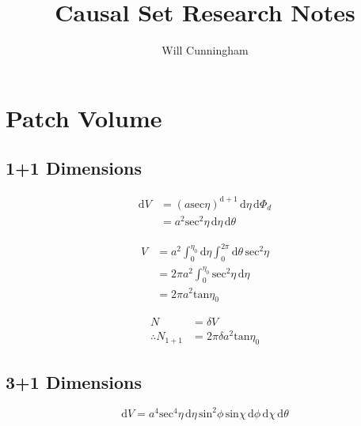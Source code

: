 \documentclass[12pt]{article}
\begin{document}
\title{Causal Set Research Notes}
\author{Will Cunningham}
\maketitle

\section{Patch Volume}
\subsection{1+1 Dimensions}

\begin{equation}
\begin{split}
\mathrm{d}V &= (a\mathrm{sec}\eta)^{\mathrm{d}+1} \, \mathrm{d}\eta \, \mathrm{d}\Phi_d \\
   &= a^2\mathrm{sec}^2\eta \, \mathrm{d}\eta \, \mathrm{d}\theta
\end{split}
\end{equation}

\begin{equation}
\begin{split}
V &= a^2\int_0^{\eta_0} \! \mathrm{d}\eta \int_0^{2\pi} \! \mathrm{d}\theta \, \mathrm{sec}^2\eta \\
  &= 2\pi a^2 \int_0^{\eta_0} \! \mathrm{sec}^2\eta \, \mathrm{d}\eta \\
  &= 2\pi a^2\mathrm{tan}\eta_0
\end{split}
\end{equation}

\begin{equation}
\begin{split}
N &= \delta V \\
\therefore N_{\mathrm{1+1}} &= 2\pi\delta a^2 \mathrm{tan}\eta_0
\end{split}
\end{equation}

\subsection{3+1 Dimensions}

\begin{equation}
\mathrm{d}V = a^4 \mathrm{sec}^4\eta \, \mathrm{d}\eta \, \mathrm{sin}^2\phi \, \mathrm{sin}\chi \, \mathrm{d}\phi \, \mathrm{d}\chi \, \mathrm{d}\theta
\end{equation}
\end{document}
